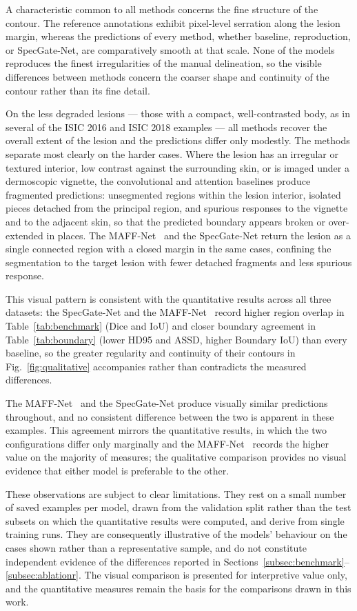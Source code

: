 A characteristic common to all methods concerns the fine structure of the contour. The reference annotations exhibit pixel-level serration along the lesion margin, whereas the predictions of every method, whether baseline, reproduction, or SpecGate-Net, are comparatively smooth at that scale. None of the models reproduces the finest irregularities of the manual delineation, so the visible differences between methods concern the coarser shape and continuity of the contour rather than its fine detail.

On the less degraded lesions --- those with a compact, well-contrasted body, as in several of the ISIC 2016 and ISIC 2018 examples --- all methods recover the overall extent of the lesion and the predictions differ only modestly. The methods separate most clearly on the harder cases. Where the lesion has an irregular or textured interior, low contrast against the surrounding skin, or is imaged under a dermoscopic vignette, the convolutional and attention baselines produce fragmented predictions: unsegmented regions within the lesion interior, isolated pieces detached from the principal region, and spurious responses to the vignette and to the adjacent skin, so that the predicted boundary appears broken or over-extended in places. The MAFF-Net~\cite{ref15} and the SpecGate-Net return the lesion as a single connected region with a closed margin in the same cases, confining the segmentation to the target lesion with fewer detached fragments and less spurious response.

This visual pattern is consistent with the quantitative results across all three datasets: the SpecGate-Net and the MAFF-Net~\cite{ref15} record higher region overlap in Table~\ref{tab:benchmark} (Dice and IoU) and closer boundary agreement in Table~\ref{tab:boundary} (lower HD95 and ASSD, higher Boundary IoU) than every baseline, so the greater regularity and continuity of their contours in Fig.~\ref{fig:qualitative} accompanies rather than contradicts the measured differences.

The MAFF-Net~\cite{ref15} and the SpecGate-Net produce visually similar predictions throughout, and no consistent difference between the two is apparent in these examples. This agreement mirrors the quantitative results, in which the two configurations differ only marginally and the MAFF-Net~\cite{ref15} records the higher value on the majority of measures; the qualitative comparison provides no visual evidence that either model is preferable to the other.

These observations are subject to clear limitations. They rest on a small number of saved examples per model, drawn from the validation split rather than the test subsets on which the quantitative results were computed, and derive from single training runs. They are consequently illustrative of the models' behaviour on the cases shown rather than a representative sample, and do not constitute independent evidence of the differences reported in Sections~\ref{subsec:benchmark}--\ref{subsec:ablationr}. The visual comparison is presented for interpretive value only, and the quantitative measures remain the basis for the comparisons drawn in this work.
